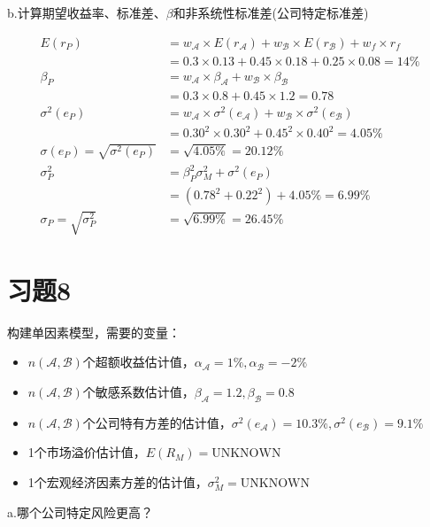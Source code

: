 \documentclass{article}
\begin{document}
b.计算期望收益率、标准差、$\beta$和非系统性标准差(公司特定标准差)
\begin{tcolorbox}
    [colback=Emerald!10,colframe=cyan!40!black,title=\textbf{$\sigma_P$是标准差，$\sigma(e_P)$是非系统性标准差}]
    \nonumber
    \begin{align}
        E(r_P)&=w_\mathcal{A} \times E(r_\mathcal{A} )+w_\mathcal{B} \times E(r_\mathcal{B})+w_f\times r_f\\
        &=0.3\times 0.13+0.45\times 0.18+0.25\times 0.08=14\%\\
        \beta_P&=w_\mathcal{A} \times \beta_\mathcal{A}+w_\mathcal{B} \times \beta_\mathcal{B}\\
        &=0.3\times 0.8+0.45\times 1.2=0.78\\
        \sigma^2(e_P)&=w_\mathcal{A} \times \sigma^2(e_\mathcal{A} )+w_\mathcal{B} \times \sigma^2(e_\mathcal{B} )\\
                &=0.30^2\times 0.30^2+0.45^2\times 0.40^2=4.05\%\\
        \sigma(e_P)=\sqrt{\sigma^2(e_P)}&=\sqrt{4.05\%}=20.12\%\\
        \sigma_P^2&=\beta_P^2\sigma_M^2+\sigma^2(e_P)\\
        &=(0.78^2+0.22^2)+4.05\%=6.99\%\\
        \sigma_P=\sqrt{\sigma_P^2}&=\sqrt{6.99\%}=26.45\%
    \end{align}
\end{tcolorbox}
\clearpage

\section*{习题8}
\begin{spacing}{0.9}
    构建单因素模型，需要的变量：
    \begin{itemize}
        \item $n(\mathcal{A} ,\mathcal{B} )$个超额收益估计值，$\alpha_\mathcal{A}=1\% ,\alpha_\mathcal{B}=-2\%$
        \item $n(\mathcal{A} ,\mathcal{B} )$个敏感系数估计值，$\beta_\mathcal{A}=1.2,\beta_\mathcal{B}=0.8$
        \item $n(\mathcal{A} ,\mathcal{B} )$个公司特有方差的估计值，$\sigma^2(e_\mathcal{A} )=10.3\%,\sigma^2(e_\mathcal{B} )=9.1\%$
        \item 1个市场溢价估计值，$E(R_M)=\text{UNKNOWN}$
        \item 1个宏观经济因素方差的估计值，$\sigma_M^2=\text{UNKNOWN}$
    \end{itemize}
\end{spacing}
a.哪个公司特定风险更高？
\end{document}
